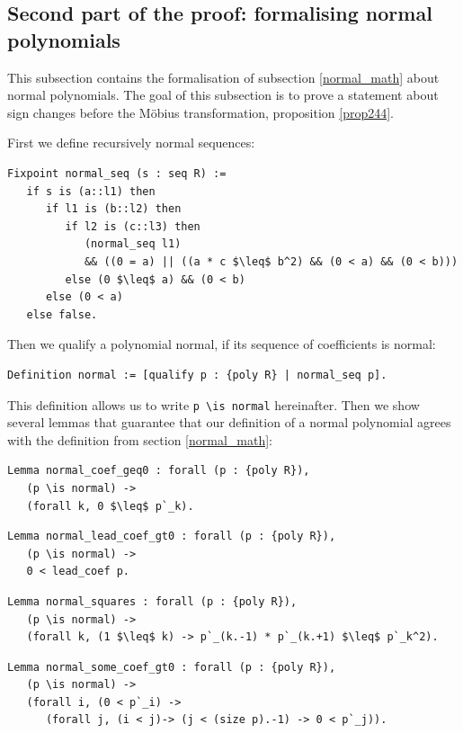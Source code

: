 \documentclass[11pt, a4paper]{article}
\begin{document}
\subsection{Second part of the proof: formalising normal polynomials}
\label{normal_coq}

This subsection contains the formalisation of subsection \ref{normal_math} about normal polynomials.
The goal of this subsection  is to prove a statement about sign changes before the M\"obius transformation, proposition \ref{prop244}.

 First we define recursively normal sequences:
\begin{lstlisting}
Fixpoint normal_seq (s : seq R) := 
   if s is (a::l1) then 
      if l1 is (b::l2) then
         if l2 is (c::l3) then 
            (normal_seq l1)
            && ((0 = a) || ((a * c $\leq$ b^2) && (0 < a) && (0 < b)))
         else (0 $\leq$ a) && (0 < b)
      else (0 < a)
   else false.
\end{lstlisting}
Then we qualify a polynomial normal, if its sequence of coefficients is normal:
\begin{lstlisting}
Definition normal := [qualify p : {poly R} | normal_seq p].
\end{lstlisting}
This definition allows us to write \lstinline!p \is normal! hereinafter.
Then we show several lemmas that guarantee that our definition of a normal polynomial agrees with the definition from section \ref{normal_math}:
\begin{lstlisting}
Lemma normal_coef_geq0 : forall (p : {poly R}),
   (p \is normal) ->
   (forall k, 0 $\leq$ p`_k). 
\end{lstlisting}

\begin{lstlisting}
Lemma normal_lead_coef_gt0 : forall (p : {poly R}),
   (p \is normal) ->
   0 < lead_coef p.
\end{lstlisting}

\begin{lstlisting}
Lemma normal_squares : forall (p : {poly R}),
   (p \is normal) ->
   (forall k, (1 $\leq$ k) -> p`_(k.-1) * p`_(k.+1) $\leq$ p`_k^2).
\end{lstlisting}

\begin{lstlisting}
Lemma normal_some_coef_gt0 : forall (p : {poly R}),
   (p \is normal) ->
   (forall i, (0 < p`_i) ->
      (forall j, (i < j)-> (j < (size p).-1) -> 0 < p`_j)).
\end{lstlisting}
\end{document}
